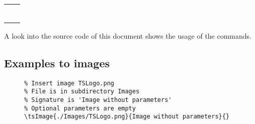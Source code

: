 \begin{footnotesize}
\begin{longtable}{ | P{0.55\textwidth} | p{0.4\textwidth} | }
                                &
                                                                                       \\
        \hline
                                   &
                                                                                          \\
        \hline
                                   &
                                                                                          \\
        \hline
                            &
                                                                                   \\
        \hline
                                &
                                                                                       \\
        \hline
                                    &
                                                                                           \\
        \hline
    \end{longtable}
\end{footnotesize}

A look into the source code of this document shows the usage of the commands.

\subsection{Examples to images}

\begin{figure}[H]
    \small
    \centering
    \begin{BVerbatim}
\tsImage{./Images/TSLogo.png}{Image without parameters}{}
    \end{BVerbatim}
\end{figure}

